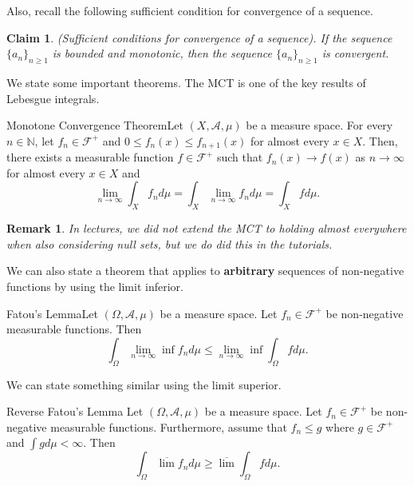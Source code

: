 \documentclass[twoside]{article}
\newtheorem{claim}[theorem]{Claim}
\newtheorem{remark}[theorem]{Remark}
\begin{document}
Also, recall the following sufficient condition for convergence of a sequence.
\begin{claim}(Sufficient conditions for convergence of a sequence). If the sequence $\{a_n\}_{n \geq 1}$ is bounded and monotonic, then the sequence $\{a_n\}_{n \geq 1}$ is convergent.
\end{claim}

We state some important theorems. The MCT is one of the key results of Lebesgue integrals.

\begin{theorem_exam}{Monotone Convergence Theorem}{}Let $(X, \mathcal{A}, \mu)$ be a measure space. For every $n \in \mathbb{N}$, let $f_n \in \mathcal{F}^+$ and $0 \leq f_n(x) \leq f_{n+1}(x)$ for almost every $x \in X.$
Then, there exists a measurable function $f \in \mathcal{F}^+$ such that $f_n(x) \rightarrow f(x)$ as $n \rightarrow \infty$ for almost every $x \in X$ and 
$$
\lim_{n \rightarrow \infty}\int_X f_nd\mu = \int_X \lim_{n \rightarrow \infty}f_nd\mu = \int_X fd\mu.
$$
\end{theorem_exam}

\begin{remark}In lectures, we did not extend the MCT to holding almost everywhere when also considering null sets, but we do did this in the tutorials.
\end{remark}

We can also state a theorem that applies to \textbf{arbitrary} sequences of non-negative functions by using the limit inferior.

\begin{theorem_exam}{Fatou's Lemma}{}Let $(\Omega, \mathcal{A}, \mu)$ be a measure space. Let $f_n \in \mathcal{F}^+$ be non-negative measurable functions. Then 
$$
\int_{\Omega} \lim_{n \rightarrow \infty} \inf f_nd\mu \leq \lim_{n \rightarrow \infty} \inf \int_{\Omega}fd\mu.
$$
\end{theorem_exam}

We can state something similar using the limit superior.

\begin{theorem_exam}{Reverse Fatou's Lemma}{}
Let $(\Omega, \mathcal{A}, \mu)$ be a measure space. Let $f_n \in \mathcal{F}^+$ be non-negative measurable functions. Furthermore, assume that $f_n \leq g$ where $g \in \mathcal{F}^+$ and $\int gd\mu < \infty.$ Then 
$$
\int_{\Omega} \overline{\lim}f_nd\mu \geq \overline{\lim}\int_{\Omega}fd\mu.
$$
\end{theorem_exam}
\end{document}
